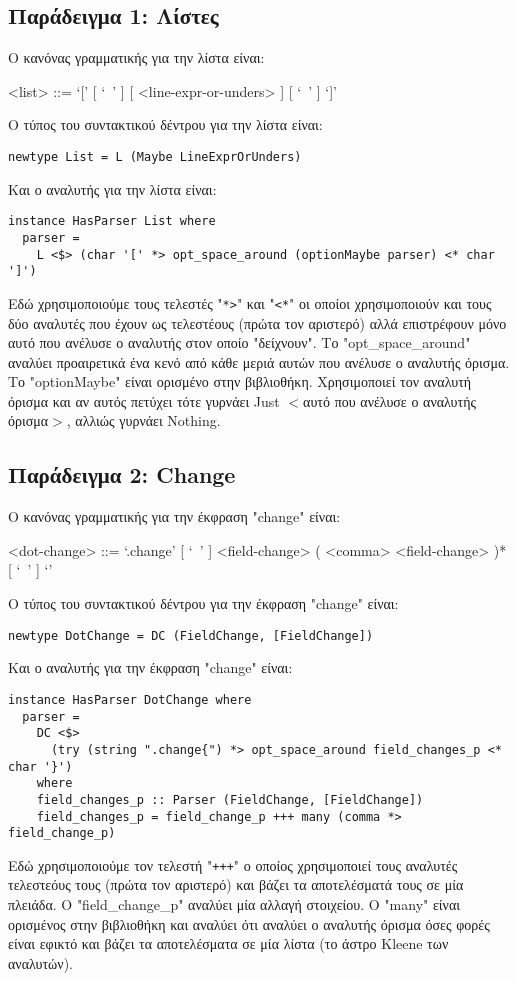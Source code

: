 \documentclass[diploma]{softlab-thesis}
\begin{document}
\newpage

\subsection{Παράδειγμα 1: Λίστες}

Ο κανόνας γραμματικής για την λίστα είναι:
\begin{grammar}
<list> ::= `[' [ `\ ' ] [ <line-expr-or-unders> ] [ `\ ' ] `]' \\
\end{grammar}
Ο τύπος του συντακτικού δέντρου για την λίστα είναι:
\begin{verbatim}
newtype List = L (Maybe LineExprOrUnders)

\end{verbatim}
Και ο αναλυτής για την λίστα είναι:
\begin{verbatim}
instance HasParser List where
  parser =
    L <$> (char '[' *> opt_space_around (optionMaybe parser) <* char ']')

\end{verbatim}
Εδώ χρησιμοποιούμε τους τελεστές "\verb|*>|" και "\verb|<*|" οι οποίοι
χρησιμοποιούν και τους δύο αναλυτές που έχουν ως τελεστέους (πρώτα τον
αριστερό) αλλά επιστρέφουν μόνο αυτό που ανέλυσε ο αναλυτής στον οποίο
"δείχνουν". Το "opt_space_around" αναλύει προαιρετικά ένα κενό
από κάθε μεριά αυτών που ανέλυσε ο αναλυτής όρισμα. Το "optionMaybe"
είναι ορισμένο στην βιβλιοθήκη. Χρησιμοποιεί τον αναλυτή όρισμα και αν αυτός
πετύχει τότε γυρνάει Just $<$αυτό που ανέλυσε ο αναλυτής όρισμα$>$, αλλιώς
γυρνάει Nothing.

\subsection{Παράδειγμα 2: Change}

Ο κανόνας γραμματικής για την έκφραση "change" είναι:
\begin{grammar}
<dot-change> ::=
`.change{' [ `\ ' ] <field-change> ( <comma> <field-change> )* [ `\ ' ] `}'
\\
\end{grammar}
Ο τύπος του συντακτικού δέντρου για την έκφραση "change" είναι:
\begin{verbatim}
newtype DotChange = DC (FieldChange, [FieldChange])

\end{verbatim}
Και ο αναλυτής για την έκφραση "change" είναι:
\begin{verbatim}
instance HasParser DotChange where
  parser =
    DC <$>
      (try (string ".change{") *> opt_space_around field_changes_p <* char '}')
    where
    field_changes_p :: Parser (FieldChange, [FieldChange])
    field_changes_p = field_change_p +++ many (comma *> field_change_p)

\end{verbatim}
Εδώ χρησιμοποιούμε τον τελεστή "\verb|+++|" ο οποίος χρησιμοποιεί τους αναλυτές
τελεστεόυς τους (πρώτα τον αριστερό) και βάζει τα αποτελέσματά τους σε μία
πλειάδα. O "field_change_p" αναλύει μία αλλαγή στοιχείου. Ο "many" είναι
ορισμένος στην βιβλιοθήκη και αναλύει ότι αναλύει ο αναλυτής όρισμα όσες
φορές είναι εφικτό και βάζει τα αποτελέσματα σε μία λίστα
(το άστρο Kleene των αναλυτών).
\end{document}
